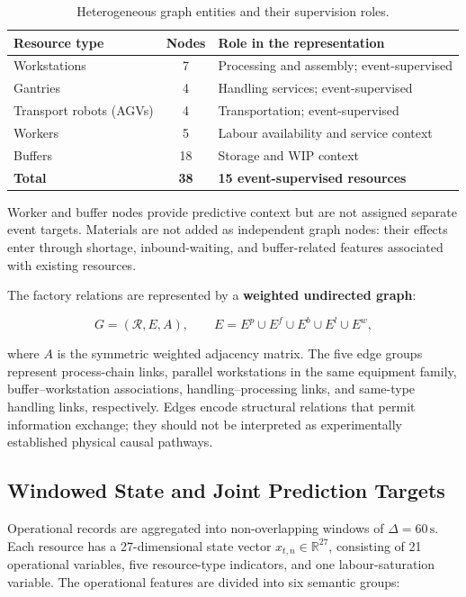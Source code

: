 \begin{table}[!htbp]
\centering
\caption{Heterogeneous graph entities and their supervision roles.}
\label{tab:resources}
\small
\begin{tabularx}{\linewidth}{@{}l c X@{}}
\toprule
Resource type & Nodes & Role in the representation \\
\midrule
Workstations & 7 & Processing and assembly; event-supervised \\
Gantries & 4 & Handling services; event-supervised \\
Transport robots (AGVs) & 4 & Transportation; event-supervised \\
Workers & 5 & Labour availability and service context \\
Buffers & 18 & Storage and WIP context \\
\midrule
\textbf{Total} & \textbf{38} & \textbf{15 event-supervised resources} \\
\bottomrule
\end{tabularx}
\end{table}
\FloatBarrier

Worker and buffer nodes provide predictive context but are not assigned separate event targets. Materials are not added as independent graph nodes: their effects enter through shortage, inbound-waiting, and buffer-related features associated with existing resources.

The factory relations are represented by a \textbf{weighted undirected graph}:

\[
G=(\mathcal{R},E,A),\qquad E=E^{p}\cup E^{f}\cup E^{b}\cup E^{l}\cup E^{w},
\]

where \(A\) is the symmetric weighted adjacency matrix. The five edge groups represent process-chain links, parallel workstations in the same equipment family, buffer--workstation associations, handling--processing links, and same-type handling links, respectively. Edges encode structural relations that permit information exchange; they should not be interpreted as experimentally established physical causal pathways.

\subsection{Windowed State and Joint Prediction Targets}\label{windowed-state-and-joint-prediction-targets}

Operational records are aggregated into non-overlapping windows of \(\Delta=60\,\mathrm{s}\). Each resource has a 27-dimensional state vector \(x_{t,n}\in\mathbb{R}^{27}\), consisting of 21 operational variables, five resource-type indicators, and one labour-saturation variable. The operational features are divided into six semantic groups:

